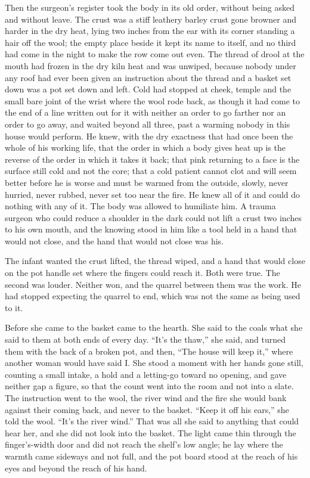 Then the surgeon's register took the body in its old order, without being asked and without leave. The crust was a stiff leathery barley crust gone browner and harder in the dry heat, lying two inches from the ear with its corner standing a hair off the wool; the empty place beside it kept its name to itself, and no third had come in the night to make the row come out even. The thread of drool at the mouth had frozen in the dry kiln heat and was unwiped, because nobody under any roof had ever been given an instruction about the thread and a basket set down was a pot set down and left. Cold had stopped at cheek, temple and the small bare joint of the wrist where the wool rode back, as though it had come to the end of a line written out for it with neither an order to go farther nor an order to go away, and  waited beyond all three, past a warming nobody in this house would perform. He knew, with the dry exactness that had once been the whole of his working life, that the order in which a body gives heat up is the reverse of the order in which it takes it back; that pink returning to a face is the surface still cold and not the core; that a cold patient cannot clot and will seem better before he is worse and must be warmed from the outside, slowly, never hurried, never rubbed, never set too near the fire. He knew all of it and could do nothing with any of it. The body was allowed to humiliate him. A trauma surgeon who could reduce a shoulder in the dark could not lift a crust two inches to his own mouth, and the knowing stood in him like a tool held in a hand that would not close, and the hand that would not close was his.

The infant wanted the crust lifted, the thread wiped, and a hand that would close on the pot handle set where the fingers could reach it. Both were true. The second was louder. Neither won, and the quarrel between them was the work. He had stopped expecting the quarrel to end, which was not the same as being used to it.

\scenebreak

Before she came to the basket  came to the hearth. She said to the coals what she said to them at both ends of every day. “It's the thaw,” she said, and turned them with the back of a broken pot, and then, “The house will keep it,” where another woman would have said I. She stood a moment with her hands gone still, counting a small intake, a hold and a letting-go toward no opening, and gave neither gap a figure, so that the count went into the room and not into a slate. The instruction went to the wool, the river wind and the fire she would bank against their coming back, and never to the basket. “Keep it off his ears,” she told the wool. “It's the river wind.” That was all she said to anything that could hear her, and she did not look into the basket. The light came thin through the finger's-width door and did not reach the shelf's low angle; he lay where the warmth came sideways and not full, and the pot board stood at the reach of his eyes and beyond the reach of his hand.

